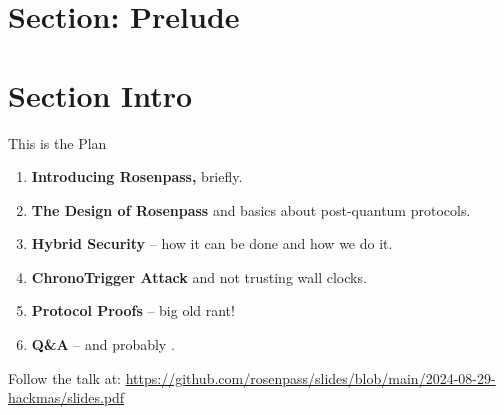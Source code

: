 \section{Section: Prelude}

\section{Section Intro}

\begin{frame}[s]{This is the Plan}
  \small
  \begin{enumerate}
    \item \textbf{Introducing Rosenpass,} briefly.
    \item \textbf{The Design of Rosenpass} and basics about post-quantum protocols.
    \item \textbf{Hybrid Security} – how it can be done and how we do it.
    \item \textbf{ChronoTrigger Attack} and not trusting wall clocks.
    \item \textbf{Protocol Proofs} – big old rant!
    \item \textbf{Q\&A} – and probably .
  \end{enumerate}

  \begin{minipage}{\textwidth}
    \vspace{.7em}
    \begin{minipage}{.6\textwidth - 1.2cm}
      \raggedright
      \footnotesize
      Follow the talk at: \href{github.com/rosenpass/slides/blob/main/2024-08-29-hackmas/slides.pdf}{https://github.com/rosenpass/slides/blob/main/2024-08-29-hackmas/slides.pdf}
    \end{minipage}
  \end{minipage}
\end{frame}



